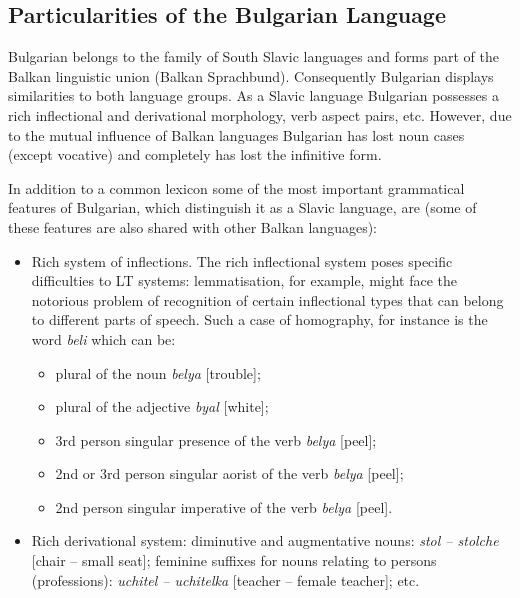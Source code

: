 \documentclass[]{../../metanetpaper}
\begin{document}
\begin{multicols}{2}
\subsection{Particularities of the Bulgarian Language}

Bulgarian belongs to the family of South Slavic languages and forms part of the Balkan linguistic union (Balkan Sprachbund). Consequently Bulgarian displays similarities to both language groups. As a Slavic language Bulgarian possesses a rich inflectional and derivational morphology, verb aspect pairs, etc. However, due to the mutual influence of Balkan languages Bulgarian has lost noun cases (except vocative) and completely has lost the infinitive form.


In addition to a common lexicon some of the most important grammatical features of Bulgarian, which distinguish it as a Slavic language, are (some of these features are also shared with other Balkan languages):

\begin{itemize}
\item Rich system of inflections. The rich inflectional system poses specific difficulties to LT systems: lemmatisation, for example, might face the notorious problem of recognition of certain inflectional types that can belong to different parts of speech. Such a case of homography, for instance is the word \textit{{beli}} which can be: 

\begin{itemize}
\item plural of the noun \textit{{belya}} [trouble];
\item plural of the adjective \textit{{byal}} [white];
\item 3rd person singular presence of the verb \textit{{belya}} [peel];
\item 2nd or 3rd person singular aorist of the verb \textit{{belya}} [peel];
\item 2nd person singular imperative of the verb \textit{{belya}} [peel]. 
\end{itemize}

\item Rich derivational system: diminutive and augmentative nouns: \textit{{stol -- stolche}} [chair -- small seat]; feminine suffixes for nouns relating to persons (professions): \textit{{uchitel -- uchitelka}} [teacher -- female teacher]; etc.


\end{itemize}
\end{multicols}
\end{document}
